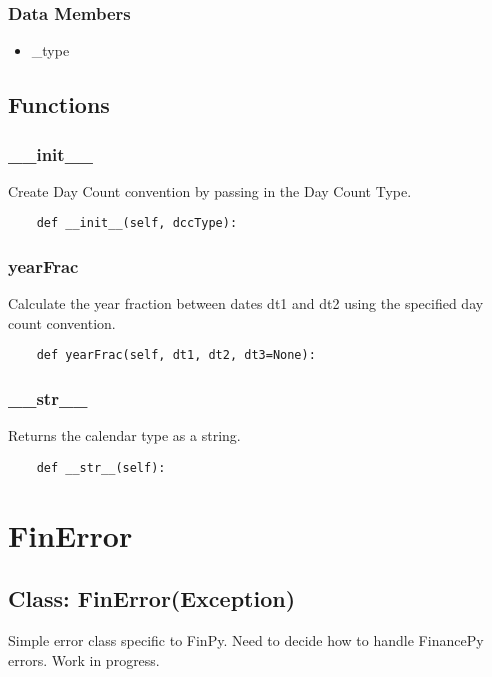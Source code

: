 \documentclass[twoside,11pt]{book}
\begin{document}
\subsubsection*{Data Members}
\begin{itemize}
\item{\_type}
\end{itemize}

\subsection*{Functions}

\subsubsection*{{\bf \_\_init\_\_}}
Create Day Count convention by passing in the Day Count Type.  

\begin{lstlisting}
    def __init__(self, dccType):
\end{lstlisting}

\subsubsection*{{\bf yearFrac}}
Calculate the year fraction between dates dt1 and dt2 using the specified day count convention.  

\begin{lstlisting}
    def yearFrac(self, dt1, dt2, dt3=None):
\end{lstlisting}

\subsubsection*{{\bf \_\_str\_\_}}
Returns the calendar type as a string.  

\begin{lstlisting}
    def __str__(self):
\end{lstlisting}

\newpage
\section{FinError}

\subsection*{Class: FinError(Exception)}
Simple error class specific to FinPy. Need to decide how to handle FinancePy errors. Work in progress.  
\end{document}
